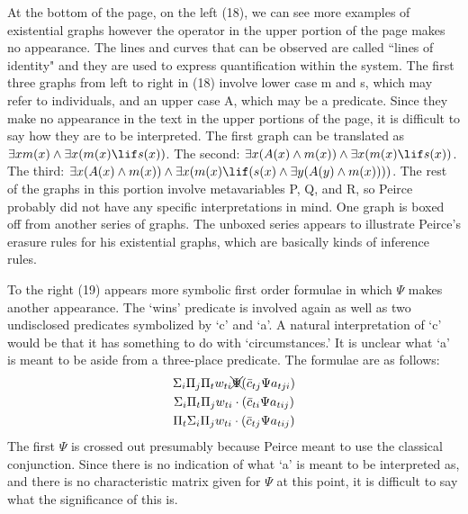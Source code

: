 \documentclass[12pt]{article}
\begin{document}
At the bottom of the page, on the left (18), we can see more examples of existential graphs however the operator in the upper portion of the page makes no appearance. The lines and curves that can be observed are called ``lines of identity" and they are used to express quantification within the system. The first three graphs from left to right in (18) involve lower case m and s, which may refer to individuals, and an upper case A, which may be a predicate. Since they make no appearance in the text in the upper portions of the page, it is difficult to say how they are to be interpreted. The first graph can be translated as $\exists x m(x) \land \exists x (m(x) \lif s(x))$. The second: $\exists x(A(x) \land m(x)) \land \exists x (m(x) \lif s(x))$. The third: $\exists x (A(x) \land m(x)) \land \exists x (m(x)\lif (s(x) \land \exists y( A(y) \land m(x))))$. The rest of the graphs in this portion involve metavariables P, Q, and R, so Peirce probably did not have any specific interpretations in mind. One graph is boxed off from another series of graphs. The unboxed series appears to illustrate Peirce's erasure rules for his existential graphs, which are basically kinds of inference rules.

To the right (19) appears more symbolic first order formulae in which $\Psi$ makes another appearance. The `wins' predicate is involved again as well as two undisclosed predicates symbolized by `c' and `a'. A natural interpretation of `c' would be that it has something to do with `circumstances.' It is unclear what `a' is meant to be aside from a three-place predicate. The formulae are as follows:
\begin{gather}
\Sigma_{i} \Pi_{j} \Pi_{t} w_{ti} \xcancel{\Psi} (\bar{c}_{tj} \Psi a_{tji}) \\
 \Sigma_{i} \Pi_{t} \Pi_{j} w_{ti} \cdot (\bar{c}_{ti} \Psi a_{tij}) \\
  \Pi_{t} \Sigma_{i} \Pi_{j} w_{ti} \cdot (\bar{c}_{tj} \Psi a_{tij})
\end{gather}
The first $\Psi$ is crossed out presumably because Peirce meant to use the classical conjunction. Since there is no indication of what `a' is meant to be interpreted as, and there is no characteristic matrix given for $\Psi$ at this point, it is difficult to say what the significance of this is.
\end{document}
